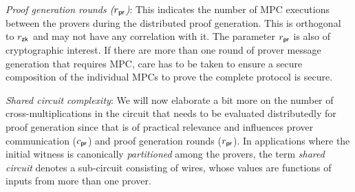 \noindent\textit{Proof generation rounds ($r_\mathsf{pr}$)}:
This indicates the number of MPC executions between the provers during the distributed proof generation. 
 This is orthogonal to $r_\mathsf{zk}$ and may not have any correlation with it. %
The parameter $r_\mathsf{pr}$ is also of cryptographic interest. If there are more than one round of prover message generation that requires MPC, care has to be taken to ensure a secure composition of the individual MPCs to prove the complete protocol is secure.

\noindent\textit{Shared circuit complexity}:
We will now elaborate a bit more on the number of cross-multiplications in the circuit that needs to be evaluated distributedly for proof generation since
that is of practical relevance and influences prover communication ($c_\mathsf{pr}$)
and proof generation rounds ($r_\mathsf{pr}$). In applications where the initial witness is canonically \textit{partitioned} among the provers,  the term \textit{shared circuit} denotes a sub-circuit consisting of wires, whose values are functions of inputs from more than one prover. 

